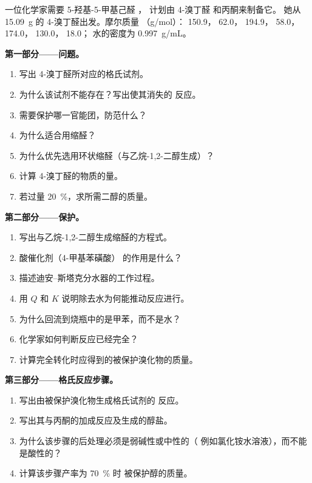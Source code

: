 \begin{problem}
\label{pb:b1:acetals-protection:1}
一位化学家需要 5-羟基-5-甲基己醛 ，
计划由 4-溴丁醛  和丙酮来制备它。
她从 \qty{15.09}{g} 的 4-溴丁醛出发。摩尔质量
（\unit{g/mol}）： 150.9， 62.0， 194.9，
 58.0， 174.0， 130.0， 18.0；
水的密度为 \qty{0.997}{g/mL}。

\medskip
\noindent\textbf{第一部分——问题。}
\begin{enumerate}
  \item 写出 4-溴丁醛所对应的格氏试剂。
  \item 为什么该试剂不能存在？写出使其消失的
        反应。
  \item 需要保护哪一官能团，防范什么？
  \item 为什么适合用缩醛？
  \item 为什么优先选用环状缩醛（与乙烷-1,2-二醇生成）？
  \item 计算 4-溴丁醛的物质的量。
  \item 若过量 \qty{20}{\percent}，求所需二醇的质量。
\end{enumerate}

\medskip
\noindent\textbf{第二部分——保护。}
\begin{enumerate}[resume]
  \item 写出与乙烷-1,2-二醇生成缩醛的方程式。
  \item 酸催化剂（4-甲基苯磺酸）
        的作用是什么？
  \item 描述迪安–斯塔克分水器的工作过程。
  \item 用 $Q$ 和 $K$ 说明除去水为何能推动反应进行。
  \item 为什么回流到烧瓶中的是甲苯，而不是水？
  \item 化学家如何判断反应已经完全？
  \item 计算完全转化时应得到的被保护溴化物的质量。
\end{enumerate}

\medskip
\noindent\textbf{第三部分——格氏反应步骤。}
\begin{enumerate}[resume]
  \item 写出由被保护溴化物生成格氏试剂的
        反应。
  \item 写出其与丙酮的加成反应及生成的醇盐。
  \item 为什么该步骤的后处理必须是弱碱性或中性的（
        例如氯化铵水溶液），而不能是酸性的？
  \item 计算该步骤产率为 \qty{70}{\percent} 时
        被保护醇的质量。
\end{enumerate}


\end{problem}
